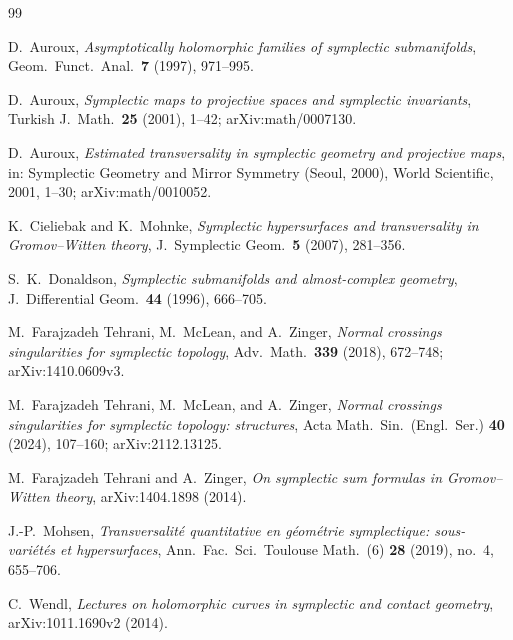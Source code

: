 \documentclass[12pt]{article}
\theoremstyle{remark}
\begin{document}
\begin{thebibliography}{99}

D.~Auroux,
\emph{Asymptotically holomorphic families of symplectic submanifolds},
Geom.\ Funct.\ Anal.\ \textbf{7} (1997), 971--995.

D.~Auroux,
\emph{Symplectic maps to projective spaces and symplectic invariants},
Turkish J.\ Math.\ \textbf{25} (2001), 1--42; arXiv:math/0007130.

D.~Auroux,
\emph{Estimated transversality in symplectic geometry and projective maps},
in: Symplectic Geometry and Mirror Symmetry (Seoul, 2000), World
Scientific, 2001, 1--30; arXiv:math/0010052.

K.~Cieliebak and K.~Mohnke,
\emph{Symplectic hypersurfaces and transversality in Gromov--Witten theory},
J.\ Symplectic Geom.\ \textbf{5} (2007), 281--356.

S.~K.~Donaldson,
\emph{Symplectic submanifolds and almost-complex geometry},
J.\ Differential Geom.\ \textbf{44} (1996), 666--705.

M.~Farajzadeh Tehrani, M.~McLean, and A.~Zinger,
\emph{Normal crossings singularities for symplectic topology},
Adv.\ Math.\ \textbf{339} (2018), 672--748; arXiv:1410.0609v3.

M.~Farajzadeh Tehrani, M.~McLean, and A.~Zinger,
\emph{Normal crossings singularities for symplectic topology: structures},
Acta Math.\ Sin.\ (Engl.\ Ser.) \textbf{40} (2024), 107--160;
arXiv:2112.13125.

M.~Farajzadeh Tehrani and A.~Zinger,
\emph{On symplectic sum formulas in Gromov--Witten theory},
arXiv:1404.1898 (2014).

J.-P.~Mohsen,
\emph{Transversalit\'e quantitative en g\'eom\'etrie symplectique:
sous-vari\'et\'es et hypersurfaces},
Ann.\ Fac.\ Sci.\ Toulouse Math.\ (6) \textbf{28} (2019), no.~4, 655--706.

C.~Wendl,
\emph{Lectures on holomorphic curves in symplectic and contact geometry},
arXiv:1011.1690v2 (2014).

\end{thebibliography}
\end{document}
